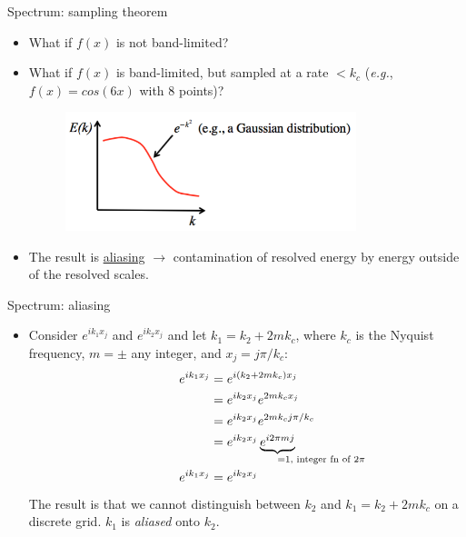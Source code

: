 \begin{frame}{Spectrum: sampling theorem}
\begin{itemize}
	\item What if $f(x)$ is not band-limited?
	\item What if $f(x)$ is band-limited, but sampled at a rate $< k_c$ (\textit{e.g.}, $f(x)=cos(6x)$ with 8 points)?
	\begin{figure}
		\includegraphics[width=0.8\textwidth]{sampling2.png}
	\end{figure}
	\item The result is \underline{aliasing} $\rightarrow$ contamination of resolved energy by energy outside of the resolved scales.
\end{itemize}
\end{frame}

\begin{frame}{Spectrum: aliasing}
\begin{itemize}
	\item Consider $e^{ik_1x_j}$ and $e^{ik_2x_j}$ and let $k_1 = k_2+ 2mk_c$, where $k_c$ is the Nyquist frequency, $m = \pm$ any integer, and $x_j=j\pi/k_c$:
	\begin{align*}
		e^{ik_1x_j}	&= e^{i(k_2 + 2mk_c)x_j}\\
		&= e^{ik_2x_j} e^{2m k_c x_j}\\
		&= e^{ik_2x_j} e^{2m k_c j\pi/k_c}\\
		&= e^{ik_2x_j} \underbrace{e^{i2\pi mj}}_{\mathrlap{\text{=1, integer fn of $2\pi$}}}\\
		e^{ik_1x_j} &= e^{ik_2x_j}
	\end{align*}
	The result is that we cannot distinguish between $k_2$ and $k_1 = k_2+ 2mk_c$ on a discrete grid. $k_1$ is \textit{aliased} onto $k_2$.
\end{itemize}
\end{frame}

